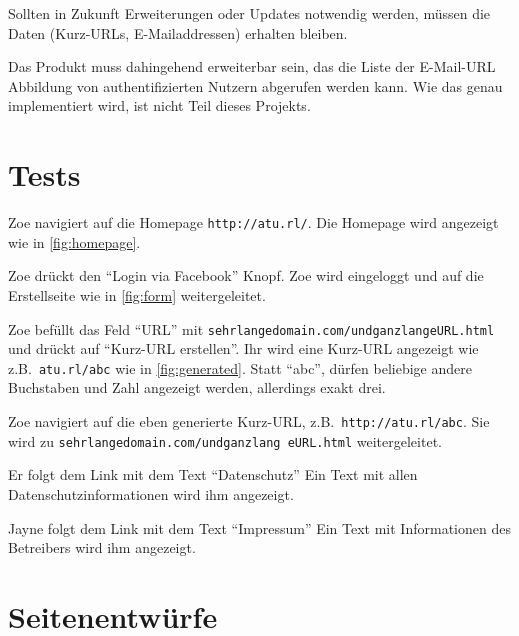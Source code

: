 \documentclass[parskip=full,11pt,twoside]{scrartcl}
\begin{document}

Sollten in Zukunft Erweiterungen oder Updates notwendig werden,
müssen die Daten (Kurz-URLs, E-Mailaddressen) erhalten bleiben.


Das Produkt muss dahingehend erweiterbar sein,
das die Liste der E-Mail-URL Abbildung von authentifizierten Nutzern
abgerufen werden kann.
Wie das genau implementiert wird, ist nicht Teil dieses Projekts.

\section{Tests}


{Zoe navigiert auf die Homepage \texttt{http://atu.rl/}.}
{Die Homepage wird angezeigt wie in \cref{fig:homepage}.}

%
{Zoe drückt den \enquote{Login via Facebook} Knopf.}%
{Zoe wird eingeloggt und auf die Erstellseite wie in \cref{fig:form} weitergeleitet.}

\teststep{}
{Zoe befüllt das Feld \enquote{URL} mit \texttt{sehrlangedomain.com/undganzlangeURL.html} und drückt auf \enquote{Kurz-URL erstellen}.}%
{Ihr wird eine Kurz-URL angezeigt wie z.B.\ \texttt{atu.rl/abc}
 wie in \cref{fig:generated}.
 Statt \enquote{abc}, dürfen beliebige andere Buchstaben und Zahl angezeigt werden, allerdings exakt drei.}

\teststep{}
{Zoe navigiert auf die eben generierte Kurz-URL, z.B.\ \texttt{http://atu.rl/abc}.}
{Sie wird zu \texttt{sehrlangedomain.com/undganzlang  eURL.html} weitergeleitet.}


{Er folgt dem Link mit dem Text \enquote{Datenschutz}}
{Ein Text mit allen Datenschutzinformationen wird ihm angezeigt.}

\teststep{}
{Jayne folgt dem Link mit dem Text \enquote{Impressum}}
{Ein Text mit Informationen des Betreibers wird ihm angezeigt.}

\pagebreak
\appendix

\section{Seitenentwürfe}
\end{document}
